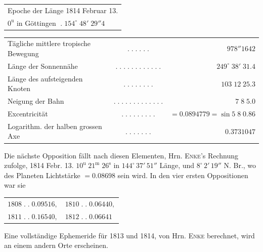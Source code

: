 \medskip
\begin{center}\fontsize{10}{12}\selectfont\setlength{\tabcolsep}{2pt}\renewcommand{\arraystretch}{1.15}\begin{tabular}{l}
Epoche der Länge 1814 Februar 13.\\$0^{\mathrm u}$ in Göttingen $\; .\; 154^\circ\;48'\;29''4$
\end{tabular}\end{center}
\begin{center}\fontsize{9}{11}\selectfont\setlength{\tabcolsep}{2pt}\renewcommand{\arraystretch}{1.15}\begin{tabular}{lcr}
Tägliche mittlere tropische Bewegung & $.\;.\;.\;.\;.\;.$ & $978''1642$\\
Länge der Sonnennähe & $.\;.\;.\;.\;.\;.\;.\;.\;.\;.\;.\;.$ & $249^\circ\;38'\;31.4$\\
Länge des aufsteigenden Knoten & $.\;.\;.\;.\;.\;.\;.\;.$ & $103\;12\;25.3$\\
Neigung der Bahn & $.\;.\;.\;.\;.\;.\;.\;.\;.\;.\;.\;.\;.$ & $7\;8\;5.0$\\
Excentricität & $.\;.\;.\;.\;.\;.\;.\;.\;.$ & $=0.0894779=\sin 5\;8\;0.86$\\
Logarithm. der halben grossen Axe & $.\;.\;.\;.\;.\;.\;.$ & $0.3731047$\\
\end{tabular}\end{center}

\par\indent Die nächste Opposition fällt nach diesen Elementen, Hrn. \textsc{Enke}'s Rechnung zufolge, 1814 Febr. 13.
$10^{\mathrm u}\;21^{\mathrm m}\;26^{\mathrm s}$ in $144^\circ\,37'\,51''$ Länge, und $8^\circ\,2'\,19''$
N. Br., wo des Planeten Lichtstärke $= 0.08698$ sein wird. In den vier ersten Oppositionen war sie

\medskip
\begin{center}\begin{tabular}{ll}$1808\;.\;.\;0.09516,$ & $1810\;.\;.\;0.06440,$\\$1811\;.\;.\;0.16540,$ & $1812\;.\;.\;0.06641$\end{tabular}\end{center}

\medskip
\noindent Eine vollständige Ephemeride für 1813 und 1814, von Hrn. \textsc{Enke} berechnet, wird an einem
andern Orte erscheinen.

